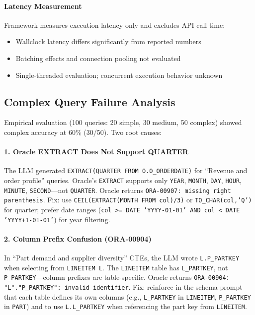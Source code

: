 \paragraph{Latency Measurement}
Framework measures execution latency only and excludes API call time:
\begin{itemize}
    \item Wallclock latency differs significantly from reported numbers
    \item Batching effects and connection pooling not evaluated
    \item Single-threaded evaluation; concurrent execution behavior unknown
\end{itemize}

\subsection{Complex Query Failure Analysis}

Empirical evaluation (100 queries: 20 simple, 30 medium, 50 complex) showed complex accuracy at 60\% (30/50). Two root causes:

\paragraph{1. Oracle EXTRACT Does Not Support QUARTER}
The LLM generated \texttt{EXTRACT(QUARTER FROM O.O\_ORDERDATE)} for ``Revenue and order profile'' queries. Oracle's \texttt{EXTRACT} supports only \texttt{YEAR}, \texttt{MONTH}, \texttt{DAY}, \texttt{HOUR}, \texttt{MINUTE}, \texttt{SECOND}---not \texttt{QUARTER}. Oracle returns \texttt{ORA-00907: missing right parenthesis}. Fix: use \texttt{CEIL(EXTRACT(MONTH FROM col)/3)} or \texttt{TO\_CHAR(col,'Q')} for quarter; prefer date ranges (\texttt{col >= DATE 'YYYY-01-01' AND col < DATE 'YYYY+1-01-01'}) for year filtering.

\paragraph{2. Column Prefix Confusion (ORA-00904)}
In ``Part demand and supplier diversity'' CTEs, the LLM wrote \texttt{L.P\_PARTKEY} when selecting from \texttt{LINEITEM L}. The \texttt{LINEITEM} table has \texttt{L\_PARTKEY}, not \texttt{P\_PARTKEY}---column prefixes are table-specific. Oracle returns \texttt{ORA-00904: "L"."P\_PARTKEY": invalid identifier}. Fix: reinforce in the schema prompt that each table defines its own columns (e.g., \texttt{L\_PARTKEY} in \texttt{LINEITEM}, \texttt{P\_PARTKEY} in \texttt{PART}) and to use \texttt{L.L\_PARTKEY} when referencing the part key from \texttt{LINEITEM}.

